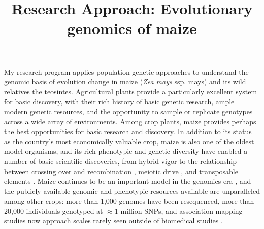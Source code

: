 \documentclass[11pt]{article}
\begin{document}
\title{\vspace{-5ex}Research Approach: Evolutionary genomics of maize\vspace{-4ex}}
\author{}
\date{}
\maketitle




\noindent My research program applies population genetic approaches to understand the genomic basis of evolution change in maize (\emph{Zea mays} ssp. {mays}) and its wild relatives the teosintes.  
Agricultural plants provide a particularly excellent system for basic discovery, with their rich history of basic genetic research, ample modern genetic resources, and the opportunity to sample or replicate genotypes across a wide array of environments.
Among crop plants, maize provides perhaps the best opportunities for basic research and discovery.
In addition to its status as the country's most economically valuable crop, maize is also one of the oldest model organisms, and its rich phenotypic and genetic diversity have enabled a number of basic scientific discoveries, from hybrid vigor \citep{shull1908composition} to the relationship between crossing over and recombination \citep{creighton1931correlation}, meiotic drive \citep{rhoades1942preferential}, and transposable elements \citep{mcclintock1950origin}. 
Maize continues to be an important model in the genomics era \citep{nannas2015genetic}, and the publicly available genomic and phenotypic resources available are unparalleled among other crops: more than 1,000 genomes have been resequenced, more than 20,000 individuals genotyped at $\approx 1$ million SNPs, and association mapping studies now approach scales rarely seen outside of biomedical studies \citep[e.g. 65,000 plots in][]{peiffer2014genetic}.\\
\end{document}
